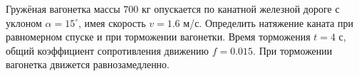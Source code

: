 Гружёная вагонетка массы $700$ кг опускается по канатной железной дороге
с уклоном $\alpha = 15^{\circ}$, имея скорость $v = 1.6$ м/с.
Определить натяжение каната при равномерном спуске
и при торможении вагонетки.
Время торможения $t = 4$ с,
общий коэффициент сопротивления движению $f = 0.015$.
При торможении вагонетка движется равнозамедленно.
